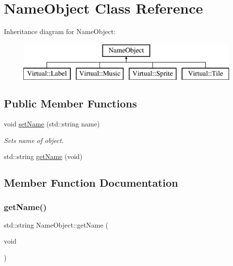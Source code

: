 \hypertarget{class_name_object}{}\section{Name\+Object Class Reference}
\label{class_name_object}
Inheritance diagram for Name\+Object\+:\begin{figure}[H]
\begin{center}
\leavevmode
\includegraphics[height=2.000000cm]{class_name_object}
\end{center}
\end{figure}
\subsection*{Public Member Functions}
\begin{DoxyCompactItemize}
\item 
void \hyperlink{class_name_object_a4172d35244e556278ae8b7dae238c16a}{set\+Name} (std\+::string name)
\begin{DoxyCompactList}\small\item\em Sets name of object. \end{DoxyCompactList}\item 
std\+::string \hyperlink{class_name_object_a8504c3c36a4d3983116866153e60bd7d}{get\+Name} (void)
\end{DoxyCompactItemize}


\subsection{Member Function Documentation}
\hypertarget{class_name_object_a8504c3c36a4d3983116866153e60bd7d}{}\label{class_name_object_a8504c3c36a4d3983116866153e60bd7d} 
\subsubsection{\texorpdfstring{get\+Name()}{getName()}}
{\footnotesize\ttfamily std\+::string Name\+Object\+::get\+Name (\begin{DoxyParamCaption}\item[{void}]{ }\end{DoxyParamCaption})\hspace{0.3cm}{\ttfamily [inline]}}

